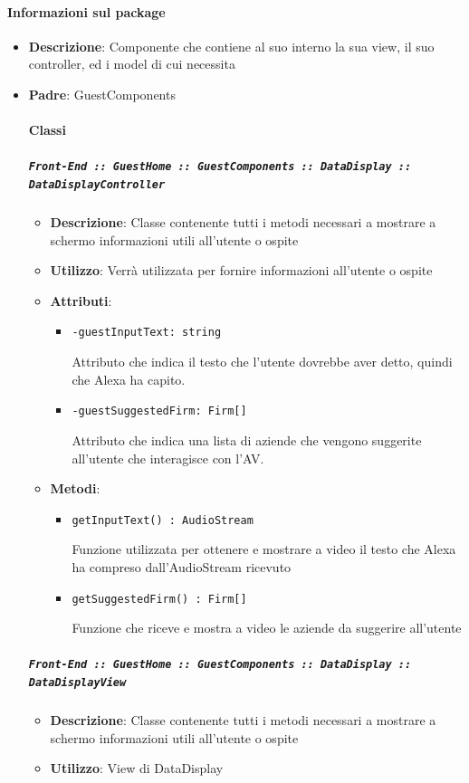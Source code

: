 \documentclass[../DefinizioneDiProdotto.tex]{subfiles}
\begin{document}
	\paragraph{Informazioni sul package}\begin{itemize}\item \textbf{Descrizione}: Componente che contiene al suo interno la sua view, il suo controller, ed i model di cui necessita\item \textbf{Padre}: GuestComponents\paragraph{Classi}
	\subparagraph{\texttt{Front-End :: GuestHome :: GuestComponents :: DataDisplay :: DataDisplayController}}
	\begin{itemize}\item \textbf{Descrizione}: Classe contenente tutti i metodi necessari a mostrare a schermo informazioni utili all'utente o ospite
	\item \textbf{Utilizzo}: Verrà utilizzata per fornire informazioni all'utente o ospite
	\item \textbf{Attributi}:
	\begin{itemize}
	\item \texttt{-guestInputText: string}\

	 Attributo che indica il testo che l'utente dovrebbe aver detto, quindi che Alexa ha capito.
	\end{itemize}
	\begin{itemize}
	\item \texttt{-guestSuggestedFirm: Firm[]}\

	 Attributo che indica una lista di aziende che vengono suggerite all'utente che interagisce con l'AV.
	\end{itemize}
	\item \textbf{Metodi}:
	\begin{itemize}
	\item \texttt{getInputText() : AudioStream}\

	 Funzione utilizzata per ottenere e mostrare a video il testo che Alexa ha compreso dall'AudioStream ricevuto
	\end{itemize}\vspace{0.5em}
	\begin{itemize}
	\item \texttt{getSuggestedFirm() : Firm[]}\

	 Funzione che riceve e mostra a video le aziende da suggerire all'utente
	\end{itemize}\vspace{0.5em}
	\end{itemize}\subparagraph{\texttt{Front-End :: GuestHome :: GuestComponents :: DataDisplay :: DataDisplayView}}
	\begin{itemize}\item \textbf{Descrizione}: Classe contenente tutti i metodi necessari a mostrare a schermo informazioni utili all'utente o ospite
	\item \textbf{Utilizzo}: View di DataDisplay
	\end{itemize}\end{itemize}
\end{document}
